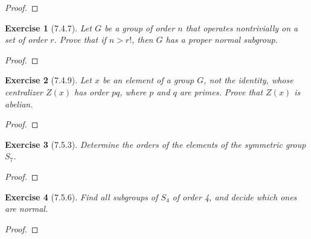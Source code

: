 \documentclass[12pt]{article}
\newtheorem*{exer}{Exercise}
\begin{document}
\begin{proof}

\end{proof}


\begin{exer}[7.4.7]

    Let $G$ be a group of order $n$ that operates nontrivially on a set
    of order $r$. Prove that if $n > r!$, then $G$ has a proper normal
    subgroup.

\end{exer}

\begin{proof}

\end{proof}


\begin{exer}[7.4.9]

    Let $x$ be an element of a group $G$, not the identity, whose
    centralizer $Z(x)$ has order $pq$, where $p$ and $q$ are primes.
    Prove that $Z(x)$ is abelian.

\end{exer}

\begin{proof}

\end{proof}


\begin{exer}[7.5.3]

    Determine the orders of the elements of the symmetric group $S_7$.

\end{exer}

\begin{proof}

\end{proof}


\begin{exer}[7.5.6]

    Find all subgroups of $S_4$ of order 4, and decide which ones are
    normal.

\end{exer}

\begin{proof}

\end{proof}
\end{document}
